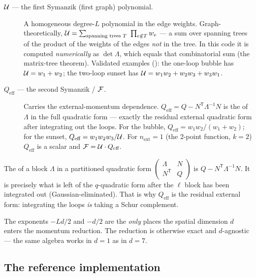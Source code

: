 \begin{description}
  \item[$\mathcal{U}$ --- the first Symanzik (first graph) polynomial.] A homogeneous
        degree-$L$ polynomial in the edge weights. Graph-theoretically,
        $\Usym = \sum_{\text{spanning trees }T}\ \prod_{e\notin T} w_e$ --- a sum
        over spanning trees of the product of the weights of the edges \emph{not}
        in the tree. In this code it is computed \emph{numerically} as
        $\det\Lambda$, which equals that combinatorial sum (the matrix-tree
        theorem). Validated examples (): the
        one-loop bubble has $\mathcal{U} = w_1+w_2$; the two-loop sunset has
        $\mathcal{U} = w_1w_2 + w_2w_3 + w_3w_1$.
  \item[$Q_{\text{eff}}$ --- the second Symanzik / $\mathcal{F}$.] Carries the
        external-momentum dependence. $Q_{\text{eff}} = Q - N^{\mathsf T}\Lambda^{-1}N$
        is the  of $\Lambda$ in the full quadratic form ---
        exactly the residual external quadratic form after integrating out the
        loops. For the bubble, $Q_{\text{eff}} = w_1w_2/(w_1+w_2)$; for the
        sunset, $Q_{\text{eff}} = w_1w_2w_3/\mathcal{U}$. For $n_{\text{ext}}=1$ (the
        2-point function, $k=2$) $Q_{\text{eff}}$ is a scalar and
        $\mathcal{F} = \mathcal{U}\cdot Q_{\text{eff}}$.
\end{description}

\begin{defn}
The  of a block $\Lambda$ in a partitioned quadratic form
$\left(\begin{smallmatrix}\Lambda & N\\ N^{\mathsf T} & Q\end{smallmatrix}\right)$ is
$Q - N^{\mathsf T}\Lambda^{-1}N$. It is precisely what is left of the $q$-quadratic
form after the $\ell$ block has been integrated out (Gaussian-eliminated). That is
why $Q_{\text{eff}}$ is the residual external form: integrating the loops
\emph{is} taking a Schur complement.
\end{defn}

The exponents $-Ld/2$ and $-d/2$ are the \emph{only} places the spatial dimension
$d$ enters the momentum reduction. The reduction is otherwise exact and
$d$-agnostic --- the same algebra works in $d=1$ as in $d=7$.

\subsection{The reference implementation}

